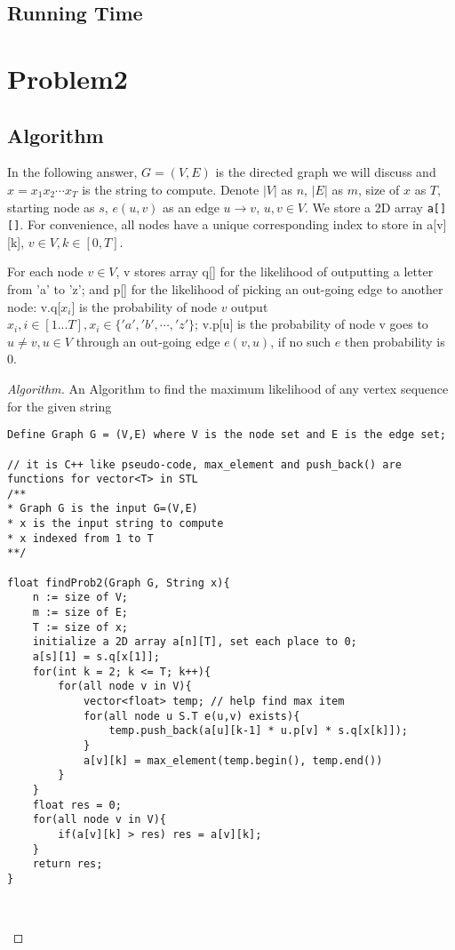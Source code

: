\documentclass[openany]{article}
\begin{document}
\subsection*{Running Time}



\section*{Problem2}

\subsection*{Algorithm}
In the following answer, $G = (V,E)$ is the directed graph we will discuss and $x=x_1x_2\cdots x_T$ is the string to compute. Denote $|V|$ as $n$, $|E|$ as $m$, size of $x$ as $T$, starting node as $s$, $e(u,v)$ as an edge $u \rightarrow v$, $u,v\in V$. We store a 2D array \texttt{a[][]}. For convenience, all nodes have a unique corresponding index to store in a[v][k], $v\in V, k\in [0, T]$.

For each node $v\in V$, v stores array q[] for the likelihood of outputting a letter from 'a' to 'z'; and p[] for the likelihood of picking an out-going edge to another node: v.q[$x_i$] is the probability of node $v$ output $x_i, i\in [1...T], x_i\in \{'a','b', \cdots, 'z'\}$; v.p[u] is the probability of node v goes to $u \neq v, u \in V$ through an out-going edge $e(v,u)$, if no such $e$ then probability is 0. 

\begin{proof}[Algorithm]{}
		\renewcommand{\qedsymbol}{}
		An Algorithm to find the maximum likelihood of any vertex sequence for the given string
		\begin{lstlisting}[basicstyle=\fontsize{8}{9}\selectfont\ttfamily]
Define Graph G = (V,E) where V is the node set and E is the edge set;

// it is C++ like pseudo-code, max_element and push_back() are functions for vector<T> in STL
/**
* Graph G is the input G=(V,E)
* x is the input string to compute
* x indexed from 1 to T
**/

float findProb2(Graph G, String x){
    n := size of V;
    m := size of E;
    T := size of x;
    initialize a 2D array a[n][T], set each place to 0;
    a[s][1] = s.q[x[1]];
    for(int k = 2; k <= T; k++){
        for(all node v in V){
            vector<float> temp; // help find max item
            for(all node u S.T e(u,v) exists){
                temp.push_back(a[u][k-1] * u.p[v] * s.q[x[k]]);
            }
            a[v][k] = max_element(temp.begin(), temp.end())
        }
    }
    float res = 0;
    for(all node v in V){
        if(a[v][k] > res) res = a[v][k];
    }
    return res;
}

        
		\end{lstlisting} 
\end{proof}
\end{document}
